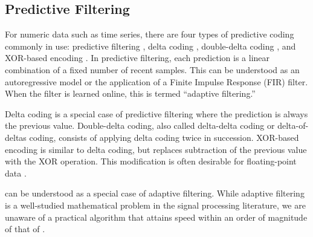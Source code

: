 \subsection{Predictive Filtering}



For numeric data such as time series, there are four types of predictive coding commonly in use: predictive filtering \cite{png}, delta coding \cite{fastpfor, bbp}, double-delta coding \cite{influxDB, gorilla}, and XOR-based encoding \cite{gorilla}. In predictive filtering, each prediction is a linear combination of a fixed number of recent samples. This can be understood as an autoregressive model or the application of a Finite Impulse Response (FIR) filter. When the filter is learned online, this is termed ``adaptive filtering.''

Delta coding is a special case of predictive filtering where the prediction is always the previous value. Double-delta coding, also called delta-delta coding or delta-of-deltas coding, consists of applying delta coding twice in succession. XOR-based encoding is similar to delta coding, but replaces subtraction of the previous value with the XOR operation. This modification is often desirable for floating-point data \cite{gorilla}.

\fire can be understood as a special case of adaptive filtering. While adaptive filtering is a well-studied mathematical problem in the signal processing literature, we are unaware of a practical algorithm that attains speed within an order of magnitude of that of \justfire. %


